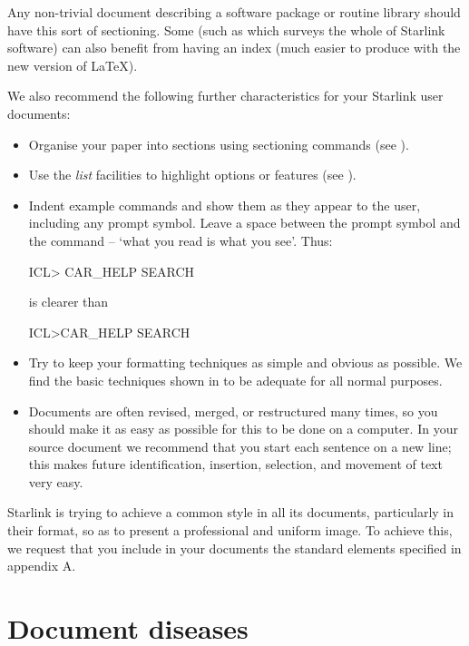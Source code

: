 \documentclass[twoside,11pt,nolof]{starlink}
\begin{document}
Any non-trivial document describing a software package or routine library
should have this sort of sectioning.
Some (such as  which surveys the whole of Starlink
software) can also benefit from having an index (much easier to produce with
the new version of \LaTeX).

We also recommend the following further characteristics for your Starlink user
documents:

\begin{itemize}

\item Organise your paper into sections using sectioning commands (see
).

\item Use the \emph{list}\/ facilities to highlight options or features
(see
).

\item Indent example commands and show them as they appear to the user,
including any prompt symbol.
Leave a space between the prompt symbol and the command -- `what you read is
what you see'.
Thus:
\begin{terminalv}
    ICL> CAR_HELP SEARCH
\end{terminalv}
is clearer than
\begin{terminalv}
ICL>CAR_HELP SEARCH
\end{terminalv}

\item Try to keep your formatting techniques as simple and obvious as possible.
We find the basic techniques shown in  to be adequate for
all normal purposes.

\item Documents are often revised, merged, or restructured many times, so
you should make it as easy as possible for this to be done on a computer.
In your source document we recommend that you start each sentence on a new
line; this makes future identification, insertion, selection, and movement
of text very easy.

\end{itemize}

Starlink is trying to achieve a common style in all its documents, particularly
in their format, so as to present a professional and uniform image.
To achieve this, we request that you include in your documents the standard
elements specified in appendix A.

\section{Document diseases}
\end{document}
